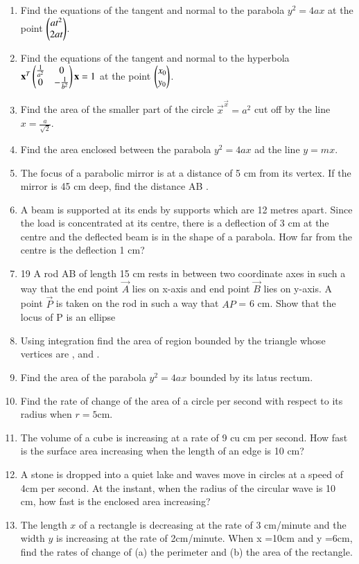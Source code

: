\begin{enumerate}[label=\arabic*.,ref=\thesubsection.\theenumi]
\item Find the equations of the tangent and normal to the parabola 
$y^2 = 4ax$ at the point $\begin{pmatrix}at^2\\2at\end{pmatrix}$.
\item Find the equations of the tangent and normal to the hyperbola 
$
\mathbf{x}^T\begin{pmatrix}\frac{1}{a^2} & 0 \\ 0 & -\frac{1}{b^2}\end{pmatrix}\mathbf{x} = 1
$
at the point $\begin{pmatrix}x_0\\ y_0 \end{pmatrix}$.
\item  Find the area of the smaller part of the circle $\vec{x}^\vec{x}=a^2$ cut off by the line $x = \frac{a}{\sqrt{2}}$.
\item Find the area enclosed between the parabola $y^2=4ax$ ad the line $y = mx$.
\item The focus of a parabolic mirror is at a distance of 5 cm from its vertex. If the mirror is 45 cm deep, find the distance AB .
\item A beam is supported at its ends by  supports which are 12 metres apart. Since the load is concentrated at its centre, there is a deflection of 3 cm at the centre and the deflected beam is in the shape of a parabola. How far from the centre is the deflection 1 cm?
\item 19 A rod AB of length 15 cm rests in between two coordinate axes in such a way that the end point $\vec{A}$ lies on x-axis and end point $\vec{B}$ lies on y-axis. A point $\vec{P}$ is taken on the rod in such a way that $AP$ = 6 cm. Show that the locus of P is an ellipse
%
\item Using integration find the area of region bounded by the triangle whose vertices are ,  and .
%
\item Find the area of the parabola $y^2 = 4ax$ bounded by its latus rectum.
\item Find the rate of change of the area of a circle per second with respect to its radius when $r = 5$cm.
\item The volume of a cube is increasing at a rate of 9 cu cm per second.  How fast is the surface area increasing when the length of an edge is 10 cm?
\item A stone is dropped into a quiet lake and waves move in circles at a speed of 4cm per second. At the instant, when the radius of the circular wave is 10 cm, how fast is the enclosed area increasing?
\item The length $x$ of a rectangle is decreasing at the rate of 3 cm/minute and the width $y$ is increasing at the rate of 2cm/minute. When x =10cm and y =6cm, find the rates of change of (a) the perimeter and (b) the area of the rectangle.

\end{enumerate}
